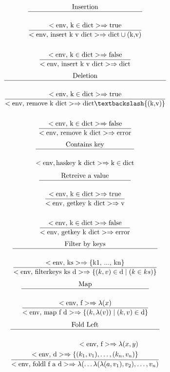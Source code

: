 \documentclass[a4paper, 11pt]{article}
\newcommand{\te}[1]{\text{#1}}
\begin{document}
\begin{multicols}{2}
\begin{gather*}
	\te{Insertion} \\
	\hline \\
	\dfrac{<\te{env, k} \in \te{dict}> \Rightarrow
	\te{true}}{<\te{env, insert k v dict}> \Rightarrow \te{dict} \cup (\te{k,v})} \\ \\
	\dfrac{<\te{env, k} \in \te{dict}> \Rightarrow \te{false}}{<\te{env, insert k v dict}> \Rightarrow \te{dict}}
\end{gather*}
\begin{gather*}
	\te{Deletion} \\ \hline \\
	\dfrac{<\te{env, k} \in \te{dict}> \Rightarrow \te{true}}{<\te{env, remove k dict}> \Rightarrow \te{dict} \textbackslash \{(\te{k,v})\}} \\ \\
	\dfrac{<\te{env, k} \in \te{dict}> \Rightarrow \te{false}}{<\te{env, remove k dict}> \Rightarrow \te{error}}
\end{gather*}
\begin{gather*}
	\te{Contains key} \\ \hline \\
	<\te{env}, \te{haskey k dict}> \Rightarrow \te{k} \in \te{dict}
\end{gather*}
\begin{gather*}
	\te{Retreive a value} \\ \hline \\
	\dfrac{<\te{env, k} \in \te{dict}> \Rightarrow \te{true}}{<\te{env, getkey k dict}> \Rightarrow \te{v}} \\ \\
	\dfrac{<\te{env, k} \in \te{dict}> \Rightarrow \te{false}}{<\te{env, getkey k dict}> \Rightarrow \te{error}}
\end{gather*}
\begin{gather*}
	\te{Filter by keys} \\ \hline \\
	\dfrac{<\te{env, ks}> \Rightarrow \te{\{k1, ..., kn\}}}{<\te{env, filterkeys ks d}> \Rightarrow \{ (k, v) \in \te{d} \mid (k \in ks) \}}
\end{gather*}
\begin{gather*}
	\te{Map} \\ \hline \\
	\dfrac{<\te{env, f}> \Rightarrow \lambda(x)}{<\te{env, map f d}> \Rightarrow \{ (k, \lambda(v)) \mid (k, v) \in \te{d}  \}}
\end{gather*}
\begin{gather*}
	\te{Fold Left} \\ \hline \\
	\dfrac{\begin{aligned}
		<\te{env, f}> \Rightarrow \lambda(x,y)  \\
		<\te{env, d}> \Rightarrow \{(k_1, v_1), \hdots, (k_n, v_n)\}
	\end{aligned}}{<\te{env, foldl f a d}> \Rightarrow \lambda( \hdots \lambda(\lambda(a, v_1), v_2), \hdots, v_n)} \\ \\
\end{gather*}



\end{multicols}
\end{document}
